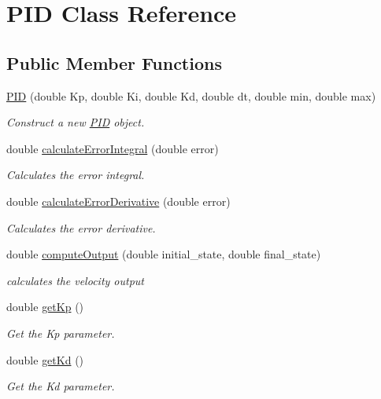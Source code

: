 \hypertarget{classPID}{}\section{P\+ID Class Reference}
\label{classPID}
\subsection*{Public Member Functions}
\begin{DoxyCompactItemize}
\item 
\hyperlink{classPID_a74e83c18b71000d5e9d9ff4f0832045c}{P\+ID} (double Kp, double Ki, double Kd, double dt, double min, double max)
\begin{DoxyCompactList}\small\item\em Construct a new \hyperlink{classPID}{P\+ID} object. \end{DoxyCompactList}\item 
double \hyperlink{classPID_ac3e8ba5eef028a4c61af628bbd351734}{calculate\+Error\+Integral} (double error)
\begin{DoxyCompactList}\small\item\em Calculates the error integral. \end{DoxyCompactList}\item 
double \hyperlink{classPID_a58446fa1dd31e998351133adbfe0d37c}{calculate\+Error\+Derivative} (double error)
\begin{DoxyCompactList}\small\item\em Calculates the error derivative. \end{DoxyCompactList}\item 
double \hyperlink{classPID_a5ea88b2d321c2c1f24aded4bd660c7c4}{compute\+Output} (double initial\+\_\+state, double final\+\_\+state)
\begin{DoxyCompactList}\small\item\em calculates the velocity output \end{DoxyCompactList}\item 
double \hyperlink{classPID_a52625de61b1b2977b2c26ddb2698f14e}{get\+Kp} ()
\begin{DoxyCompactList}\small\item\em Get the Kp parameter. \end{DoxyCompactList}\item 
double \hyperlink{classPID_a39997546e8d1025c6c867e31e8b8e916}{get\+Kd} ()
\begin{DoxyCompactList}\small\item\em Get the Kd parameter. \end{DoxyCompactList}\item 

\end{DoxyCompactItemize}
